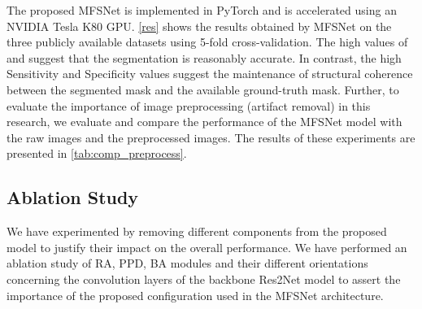 \documentclass[review]{elsarticle}
\begin{document}
\begin{table*}[]
\centering
\caption{Comparison of the results obtained with the MFSNet model on the three datasets with and without image preprocessing}
\label{tab:comp_preprocess}
\end{table*}

The proposed MFSNet is implemented in PyTorch and is accelerated using an NVIDIA Tesla K80 GPU. \autoref{res} shows the results obtained by MFSNet on the three publicly available datasets using 5-fold cross-validation. The high values of  and  suggest that the segmentation is reasonably accurate. In contrast, the high Sensitivity and Specificity values suggest the maintenance of structural coherence between the segmented mask and the available ground-truth mask. Further, to evaluate the importance of image preprocessing (artifact removal) in this research, we evaluate and compare the performance of the MFSNet model with the raw images and the preprocessed images. The results of these experiments are presented in \autoref{tab:comp_preprocess}.

\subsection{Ablation Study}\label{ablation}
We have experimented by removing different components from the proposed model to justify their impact on the overall performance. We have performed an ablation study of RA, PPD, BA modules and their different orientations concerning the convolution layers of the backbone Res2Net model to assert the importance of the proposed configuration used in the MFSNet architecture.
\end{document}

